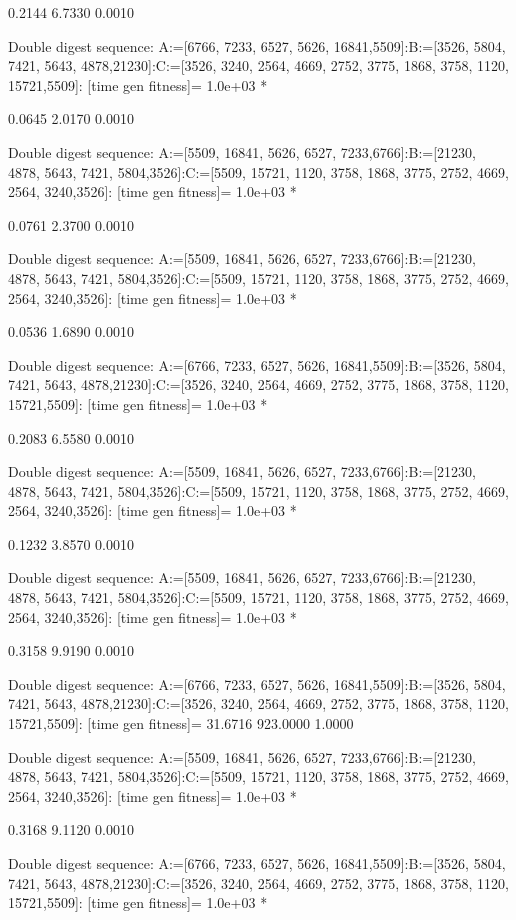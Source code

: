     0.2144    6.7330    0.0010

Double digest sequence:
A:=[6766, 7233, 6527, 5626, 16841,5509]:B:=[3526, 5804, 7421, 5643, 4878,21230]:C:=[3526, 3240, 2564, 4669, 2752, 3775, 1868, 3758, 1120, 15721,5509]:
[time gen fitness]=
   1.0e+03 *

    0.0645    2.0170    0.0010

Double digest sequence:
A:=[5509, 16841, 5626, 6527, 7233,6766]:B:=[21230, 4878, 5643, 7421, 5804,3526]:C:=[5509, 15721, 1120, 3758, 1868, 3775, 2752, 4669, 2564, 3240,3526]:
[time gen fitness]=
   1.0e+03 *

    0.0761    2.3700    0.0010

Double digest sequence:
A:=[5509, 16841, 5626, 6527, 7233,6766]:B:=[21230, 4878, 5643, 7421, 5804,3526]:C:=[5509, 15721, 1120, 3758, 1868, 3775, 2752, 4669, 2564, 3240,3526]:
[time gen fitness]=
   1.0e+03 *

    0.0536    1.6890    0.0010

Double digest sequence:
A:=[6766, 7233, 6527, 5626, 16841,5509]:B:=[3526, 5804, 7421, 5643, 4878,21230]:C:=[3526, 3240, 2564, 4669, 2752, 3775, 1868, 3758, 1120, 15721,5509]:
[time gen fitness]=
   1.0e+03 *

    0.2083    6.5580    0.0010

Double digest sequence:
A:=[5509, 16841, 5626, 6527, 7233,6766]:B:=[21230, 4878, 5643, 7421, 5804,3526]:C:=[5509, 15721, 1120, 3758, 1868, 3775, 2752, 4669, 2564, 3240,3526]:
[time gen fitness]=
   1.0e+03 *

    0.1232    3.8570    0.0010

Double digest sequence:
A:=[5509, 16841, 5626, 6527, 7233,6766]:B:=[21230, 4878, 5643, 7421, 5804,3526]:C:=[5509, 15721, 1120, 3758, 1868, 3775, 2752, 4669, 2564, 3240,3526]:
[time gen fitness]=
   1.0e+03 *

    0.3158    9.9190    0.0010

Double digest sequence:
A:=[6766, 7233, 6527, 5626, 16841,5509]:B:=[3526, 5804, 7421, 5643, 4878,21230]:C:=[3526, 3240, 2564, 4669, 2752, 3775, 1868, 3758, 1120, 15721,5509]:
[time gen fitness]=
   31.6716  923.0000    1.0000

Double digest sequence:
A:=[5509, 16841, 5626, 6527, 7233,6766]:B:=[21230, 4878, 5643, 7421, 5804,3526]:C:=[5509, 15721, 1120, 3758, 1868, 3775, 2752, 4669, 2564, 3240,3526]:
[time gen fitness]=
   1.0e+03 *

    0.3168    9.1120    0.0010

Double digest sequence:
A:=[6766, 7233, 6527, 5626, 16841,5509]:B:=[3526, 5804, 7421, 5643, 4878,21230]:C:=[3526, 3240, 2564, 4669, 2752, 3775, 1868, 3758, 1120, 15721,5509]:
[time gen fitness]=
   1.0e+03 *

